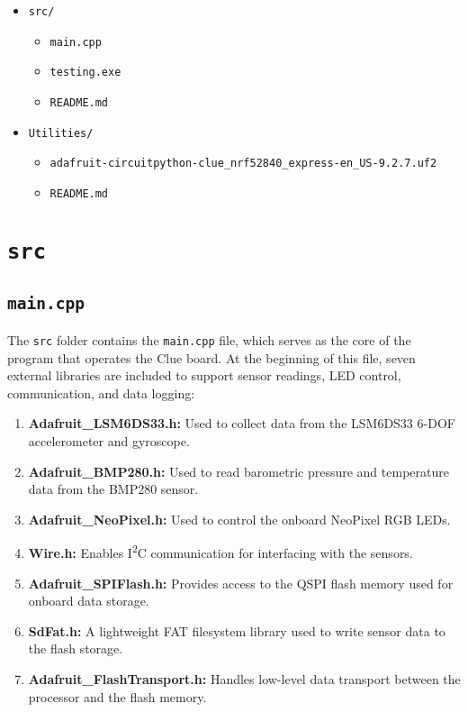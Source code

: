 \documentclass[12pt]{report}
\begin{document}
\begin{itemize}
\begin{itemize}
\begin{itemize}
      \end{itemize}
      \item \texttt{src/}
      \begin{itemize}
        \item \texttt{main.cpp}
        \item \texttt{testing.exe}
        \item \texttt{README.md}
      \end{itemize}
      \item \texttt{Utilities/}
      \begin{itemize}
        \item \texttt{adafruit-circuitpython-clue\_nrf52840\_express-en\_US-9.2.7.uf2}
        \item \texttt{README.md}
      \end{itemize}
    \end{itemize}
\end{itemize}

\section{\texttt{src}}

\subsection{\texttt{main.cpp}}

The \texttt{src} folder contains the \texttt{main.cpp} file, which serves as the core of the program that operates the Clue board. At the beginning of this file, seven external libraries are included to support sensor readings, LED control, communication, and data logging:

\begin{enumerate}
    \item \textbf{Adafruit\_LSM6DS33.h:} Used to collect data from the LSM6DS33 6-DOF accelerometer and gyroscope.
    \item \textbf{Adafruit\_BMP280.h:} Used to read barometric pressure and temperature data from the BMP280 sensor.
    \item \textbf{Adafruit\_NeoPixel.h:} Used to control the onboard NeoPixel RGB LEDs.
    \item \textbf{Wire.h:} Enables I\textsuperscript{2}C communication for interfacing with the sensors.
    \item \textbf{Adafruit\_SPIFlash.h:} Provides access to the QSPI flash memory used for onboard data storage.
    \item \textbf{SdFat.h:} A lightweight FAT filesystem library used to write sensor data to the flash storage.
    \item \textbf{Adafruit\_FlashTransport.h:} Handles low-level data transport between the processor and the flash memory.
\end{enumerate}
\end{document}
